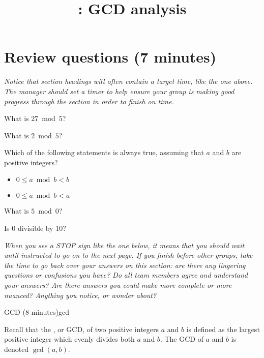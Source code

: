\documentclass{tufte-handout}
\title{\thecourse: GCD analysis}
\date{}
\begin{document}
\maketitle

\section{Review questions (7 minutes)}

\begin{mdframed}
  \emph{Notice that section headings will often contain a target time,
like the one above.  The manager should set a timer to help
ensure your group is making good progress through the section in order
to finish on time.}
\end{mdframed}

\begin{questions}
  \item What is $27 \bmod 5$?
  \item What is $2 \bmod 5$?
  \item Which of the following statements is always true, assuming that $a$
    and $b$ are positive integers?
    \begin{itemize}
    \item $0 \leq a \bmod b < b$
    \item $0 \leq a \bmod b < a$
    \end{itemize}
  \item What is $5 \bmod 0$?
  \item Is $0$ divisible by $10$?
\end{questions}
\vfill
\begin{mdframed}[innerrightmargin=1cm]
  \emph{When you see a STOP sign like the one below, it means that you
    should wait until instructed to go on to the next page.  If you
    finish before other groups, take the time to go back over your
    answers on this section: are there any lingering questions or
    confusions you have? Do all team members agree and understand your
    answers?  Are there answers you could make more complete or more
    nuanced?  Anything you notice, or wonder about?}
\end{mdframed}
\pause

\begin{model*}{GCD (8 minutes)}{gcd}
\begin{defn}
  Recall that the , or GCD, of two
  positive integers $a$ and $b$ is defined as the largest positive
  integer which evenly divides both $a$ and $b$.  The GCD of $a$ and
  $b$ is denoted $\gcd(a,b)$.
\end{defn}
\end{model*}
\end{document}
